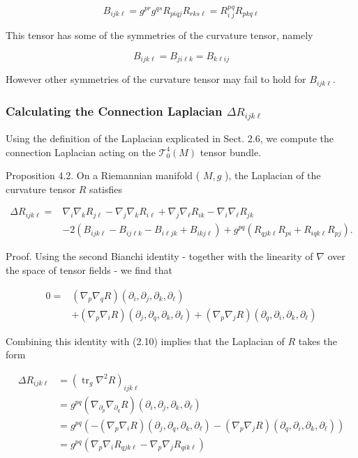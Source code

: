 \documentclass[10pt, letterpaper]{article}
\begin{document}
$$
B_{i j k \ell}=g^{p r} g^{q s} R_{p i q j} R_{r k s \ell}=R_{i}^{p}{ }_{j}^{q} R_{p k q \ell}
$$

This tensor has some of the symmetries of the curvature tensor, namely

$$
B_{i j k \ell}=B_{j i \ell k}=B_{k \ell i j}
$$

However other symmetries of the curvature tensor may fail to hold for $B_{i j k \ell}$.

\subsubsection*{Calculating the Connection Laplacian $\Delta R_{i j k \ell}$}
Using the definition of the Laplacian explicated in Sect. 2.6, we compute the connection Laplacian acting on the $\mathscr{T}_{0}^{4}(M)$ tensor bundle.

Proposition 4.2. On a Riemannian manifold ( $M, g$ ), the Laplacian of the curvature tensor $R$ satisfies

$$
\begin{aligned}
\Delta R_{i j k \ell}= & \nabla_{i} \nabla_{k} R_{j \ell}-\nabla_{j} \nabla_{k} R_{i \ell}+\nabla_{j} \nabla_{\ell} R_{i k}-\nabla_{i} \nabla_{\ell} R_{j k} \\
& -2\left(B_{i j k \ell}-B_{i j \ell k}-B_{i \ell j k}+B_{i k j \ell}\right)+g^{p q}\left(R_{q j k \ell} R_{p i}+R_{i q k \ell} R_{p j}\right) .
\end{aligned}
$$

Proof. Using the second Bianchi identity - together with the linearity of $\nabla$ over the space of tensor fields - we find that

$$
\begin{aligned}
0= & \left(\nabla_{p} \nabla_{q} R\right)\left(\partial_{i}, \partial_{j}, \partial_{k}, \partial_{\ell}\right) \\
& +\left(\nabla_{p} \nabla_{i} R\right)\left(\partial_{j}, \partial_{q}, \partial_{k}, \partial_{\ell}\right)+\left(\nabla_{p} \nabla_{j} R\right)\left(\partial_{q}, \partial_{i}, \partial_{k}, \partial_{\ell}\right)
\end{aligned}
$$

Combining this identity with (2.10) implies that the Laplacian of $R$ takes the form

$$
\begin{aligned}
\Delta R_{i j k \ell} & =\left(\operatorname{tr}_{g} \nabla^{2} R\right)_{i j k \ell} \\
& =g^{p q}\left(\nabla_{\partial_{p}} \nabla_{\partial_{q}} R\right)\left(\partial_{i}, \partial_{j}, \partial_{k}, \partial_{\ell}\right) \\
& =g^{p q}\left(-\left(\nabla_{p} \nabla_{i} R\right)\left(\partial_{j}, \partial_{q}, \partial_{k}, \partial_{\ell}\right)-\left(\nabla_{p} \nabla_{j} R\right)\left(\partial_{q}, \partial_{i}, \partial_{k}, \partial_{\ell}\right)\right) \\
& =g^{p q}\left(\nabla_{p} \nabla_{i} R_{q j k \ell}-\nabla_{p} \nabla_{j} R_{q i k \ell}\right)
\end{aligned}
$$
\end{document}
